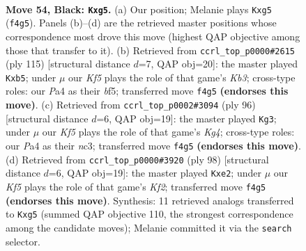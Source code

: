 \documentclass[11pt]{article}
\begin{document}
\clearpage

\begin{figure}[p]\centering
\begin{subfigure}{0.46\textwidth}\centering
\resizebox{\linewidth}{!}{%
\newchessgame
\chessboard[
  setfen={7K/8/6p1/6P1/p4k2/3b4/8/6b1 b - - 15 54},
  showmover=false,
  pgfstyle=straightmove, color=movearrow, markmove={f4-g5}
]}
\caption{}
\end{subfigure}\hfill
\begin{subfigure}{0.46\textwidth}\centering
\resizebox{\linewidth}{!}{%
\newchessgame
\chessboard[
  setfen={8/8/1k3b2/1P1K1B2/8/2p5/8/8 b - - 5 58},
  showmover=false,
  pgfstyle=straightmove, color=movearrow, markmove={b6-b5}
]}
\caption{}
\end{subfigure}
\\[4pt]
\begin{subfigure}{0.46\textwidth}\centering
\resizebox{\linewidth}{!}{%
\newchessgame
\chessboard[
  setfen={8/2k5/P7/6p1/2B3K1/2n5/8/8 w - - 1 49},
  showmover=false,
  pgfstyle=straightmove, color=movearrow, markmove={g4-g3}
]}
\caption{}
\end{subfigure}\hfill
\begin{subfigure}{0.46\textwidth}\centering
\resizebox{\linewidth}{!}{%
\newchessgame
\chessboard[
  setfen={5k2/7B/8/6b1/8/7p/2P1pK2/8 w - - 0 50},
  showmover=false,
  pgfstyle=straightmove, color=movearrow, markmove={f2-e2}
]}
\caption{}
\end{subfigure}
\caption{\textbf{Move 54, Black: \texttt{Kxg5}.} (a) Our position; Melanie plays \texttt{Kxg5} (\texttt{f4g5}). Panels (b)--(d) are the retrieved master positions whose correspondence most drove this move (highest QAP objective among those that transfer to it). (b) Retrieved from \texttt{ccrl\_top\_p0000\#2615} (ply 115) [structural distance $d$=7, QAP obj=20]: the master played \texttt{Kxb5}; under $\mu$ our \emph{Kf5} plays the role of that game's \emph{Kb3}; cross-type roles: our \emph{P}a4 as their \emph{b}f5; transferred move \texttt{f4g5} \textbf{(endorses this move)}. (c) Retrieved from \texttt{ccrl\_top\_p0002\#3094} (ply 96) [structural distance $d$=6, QAP obj=19]: the master played \texttt{Kg3}; under $\mu$ our \emph{Kf5} plays the role of that game's \emph{Kg4}; cross-type roles: our \emph{P}a4 as their \emph{n}c3; transferred move \texttt{f4g5} \textbf{(endorses this move)}. (d) Retrieved from \texttt{ccrl\_top\_p0000\#3920} (ply 98) [structural distance $d$=6, QAP obj=19]: the master played \texttt{Kxe2}; under $\mu$ our \emph{Kf5} plays the role of that game's \emph{Kf2}; transferred move \texttt{f4g5} \textbf{(endorses this move)}. Synthesis: 11 retrieved analogs transferred to \texttt{Kxg5} (summed QAP objective 110, the strongest correspondence among the candidate moves); Melanie committed it via the \texttt{search} selector.}
\label{fig:thought-m107}
\end{figure}
\end{document}
